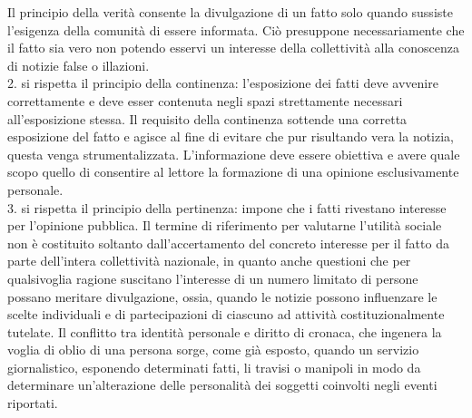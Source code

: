 Il principio della verità consente la divulgazione di un fatto solo quando sussiste l'esigenza della comunità di essere informata. Ciò presuppone necessariamente che il fatto sia vero non potendo esservi un interesse della collettività alla conoscenza di notizie false o illazioni.
\\2. si rispetta il principio della continenza: l'esposizione dei fatti deve avvenire correttamente e deve esser contenuta negli spazi strettamente necessari all'esposizione stessa. Il requisito della continenza sottende una corretta esposizione del fatto e agisce al fine di evitare che pur risultando vera la notizia, questa venga strumentalizzata.
L'informazione deve essere obiettiva e avere quale scopo quello di consentire al lettore la formazione di una opinione esclusivamente personale.
\\3. si rispetta il principio della pertinenza: impone che i fatti rivestano interesse per l'opinione pubblica. Il termine di riferimento per valutarne l'utilità sociale non è costituito soltanto dall'accertamento del concreto interesse per il fatto da parte dell'intera collettività nazionale, in quanto anche questioni che per qualsivoglia ragione suscitano l'interesse di un numero limitato di persone possano meritare divulgazione, ossia, quando le notizie possono influenzare le scelte individuali e di partecipazioni di ciascuno ad attività costituzionalmente tutelate. %
Il conflitto tra identità personale e diritto di cronaca, che ingenera la voglia di oblio di una persona sorge, come già esposto, quando un servizio giornalistico, esponendo determinati fatti, li travisi o manipoli in modo da determinare un'alterazione delle personalità dei soggetti coinvolti negli eventi riportati. %
